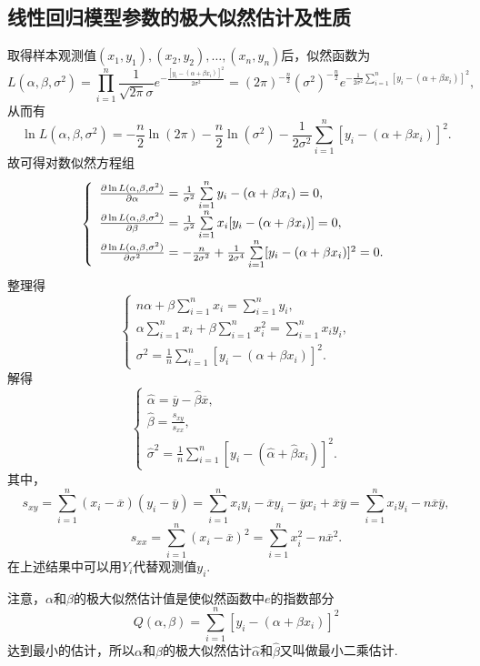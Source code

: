 \subsection{线性回归模型参数的极大似然估计及性质}
取得样本观测值\((x_1,y_1),(x_2,y_2),\dotsc,(x_n,y_n)\)后，似然函数为\[
L(\alpha,\beta,\sigma^2)
= \prod\limits_{i=1}^n{ \frac{1}{\sqrt{2\pi}\sigma} e^{ -\frac{[y_i - (\alpha+\beta x_i)]^2}{2\sigma^2} } }
= (2\pi)^{-\frac{n}{2}} (\sigma^2)^{-\frac{n}{2}} e^{ -\frac{1}{2\sigma^2} \sum\limits_{i=1}^n[y_i - (\alpha+\beta x_i)]^2 },
\]从而有\[
\ln L(\alpha,\beta,\sigma^2)
= -\frac{n}{2} \ln(2\pi) - \frac{n}{2} \ln(\sigma^2) - \frac{1}{2\sigma^2} \sum\limits_{i=1}^n[y_i-(\alpha+\beta x_i)]^2.
\]故可得对数似然方程组\[
\left\{ \begin{array}{l}
\pdv{\ln L(\alpha,\beta,\sigma^2)}{\alpha}
= \frac{1}{\sigma^2} \sum\limits_{i=1}^n{y_i-(\alpha+\beta x_i)} = 0, \\
\pdv{\ln L(\alpha,\beta,\sigma^2)}{\beta}
= \frac{1}{\sigma^2} \sum\limits_{i=1}^n{x_i[y_i-(\alpha+\beta x_i)]} = 0, \\
\pdv{\ln L(\alpha,\beta,\sigma^2)}{\sigma^2}
= -\frac{n}{2\sigma^2} + \frac{1}{2\sigma^4} \sum\limits_{i=1}^n[y_i-(\alpha+\beta x_i)]^2 = 0.
\end{array} \right.
\]整理得\[
\left\{ \begin{array}{l}
n \alpha + \beta \sum\limits_{i=1}^n{x_i} = \sum\limits_{i=1}^n{y_i}, \\
\alpha \sum\limits_{i=1}^n{x_i} + \beta \sum\limits_{i=1}^n{x_i^2} = \sum\limits_{i=1}^n{x_i y_i}, \\
\sigma^2 = \frac{1}{n} \sum\limits_{i=1}^n[y_i - (\alpha+\beta x_i)]^2.
\end{array} \right.
\]解得\[
\left\{ \begin{array}{l}
\hat{\alpha} = \overline{y} - \hat{\beta} \overline{x}, \\
\hat{\beta} = \frac{s_{xy}}{s_{xx}}, \\
\hat{\sigma}^2 = \frac{1}{n} \sum\limits_{i=1}^n[y_i - (\hat{\alpha}+\hat{\beta}x_i)]^2.
\end{array} \right.
\]其中，\[
s_{xy} = \sum\limits_{i=1}^n(x_i-\overline{x})(y_i-\overline{y})
= \sum\limits_{i=1}^n{x_i y_i - \overline{x}y_i - \overline{y}x_i + \overline{x}\overline{y}}
= \sum\limits_{i=1}^n{x_i y_i - n \overline{x} \overline{y}},
\]\[
s_{xx} = \sum\limits_{i=1}^n(x_i - \overline{x})^2
= \sum\limits_{i=1}^n{x_i^2 - n \overline{x}^2}.
\]
在上述结果中可以用\(Y_i\)代替观测值\(y_i\).

注意，\(\alpha\)和\(\beta\)的极大似然估计值是使似然函数中\(e\)的指数部分\[
Q(\alpha,\beta) = \sum\limits_{i=1}^n[y_i-(\alpha+\beta x_i)]^2
\]达到最小的估计，所以\(\alpha\)和\(\beta\)的极大似然估计\(\hat{\alpha}\)和\(\hat{\beta}\)又叫做最小二乘估计.

